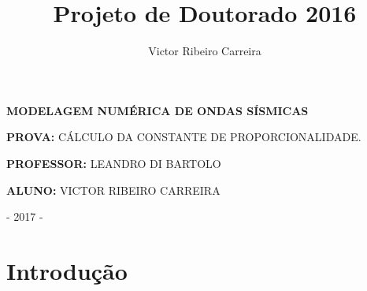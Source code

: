 \documentclass[12pt,a4paper,final]{report}%
\author{Victor Ribeiro Carreira}
\title{Projeto de Doutorado 2016}
\begin{document}
\thispagestyle{empty}%


\begin{figure}[H]
\centering
{}
\end{figure}

\vspace{1cm}

\begin{center}
\textbf{MODELAGEM NUMÉRICA DE ONDAS SÍSMICAS}
\end{center}

\vspace{3cm}

\begin{center}
\textbf{PROVA:} CÁLCULO DA CONSTANTE DE PROPORCIONALIDADE.
\end{center}

\vspace{2.5cm}

\begin{center}
\textbf{PROFESSOR:} LEANDRO DI BARTOLO
\end{center}

\begin{center}
\textbf{ALUNO:} VICTOR RIBEIRO CARREIRA
\end{center}

\vspace{10cm}

\begin{center}
- 2017 -
\end{center}



\pagebreak%
\section*{Introdução}
\end{document}
